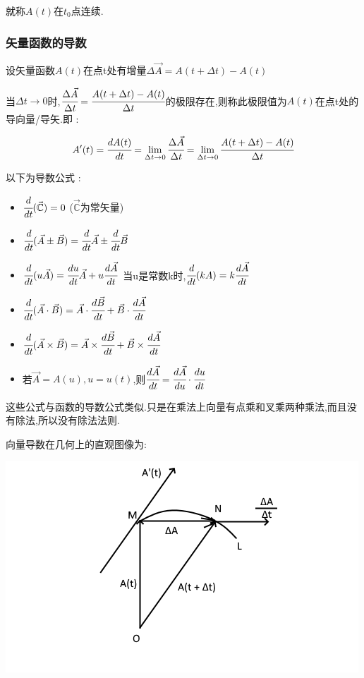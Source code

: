 \documentclass[UTF8,12pt]{ctexbook}
\newcommand{\limNormal}[1]{\lim\limits_{#1}}
\newcommand{\derivative}{^\prime}
\newcommand{\mathConstant}{\mathbb{C}}
\begin{document}
{{{{{      就称$A(t)$在$t_0$点连续.
    }%

    \subsubsection{矢量函数的导数}{
      设矢量函数$A(t)$在点t处有增量$\Delta \vec{A} = A(t + \Delta t) - A(t)$

      当$\Delta t \to 0$时,$\cfrac{\Delta \vec{A}}{\Delta t} = \cfrac{A(t + \Delta t) - A(t)}{\Delta t}$的极限存在,则称此极限值为$A(t)$在点t处的导向量/导矢.即 :

      $$
        A\derivative(t) = \cfrac{dA(t)}{dt} = \limNormal{\Delta t \to 0}\cfrac{\Delta \vec{A}}{\Delta t} = \limNormal{\Delta t \to 0}\cfrac{A(t + \Delta t) - A(t)}{\Delta t}
      $$

      以下为导数公式 :

      \begin{itemize}
        \item $\cfrac{d}{dt}(\vec{\mathConstant}) = 0$ ($\vec{\mathConstant}$为常矢量)
        \item $\cfrac{d}{dt}(\vec{A} \pm \vec{B}) = \cfrac{d}{dt}\vec{A} \pm \cfrac{d}{dt}\vec{B}$
        \item $\cfrac{d}{dt}(u\vec{A}) = \cfrac{du}{dt}\vec{A} + u\cfrac{d\vec{A}}{dt}$\ 当u是常数k时,$\cfrac{d}{dt}(kA) = k\cfrac{d\vec{A}}{dt}$
        \item $\cfrac{d}{dt}(\vec{A}\cdot\vec{B}) = \vec{A}\cdot\cfrac{d\vec{B}}{dt} + \vec{B}\cdot\cfrac{d\vec{A}}{dt}$
        \item $\cfrac{d}{dt}(\vec{A}\times\vec{B}) = \vec{A}\times\cfrac{d\vec{B}}{dt} + \vec{B}\times\cfrac{d\vec{A}}{dt}$
        \item 若$\vec{A} = A(u),u = u(t)$,则$\cfrac{d\vec{A}}{dt} = \cfrac{d\vec{A}}{du}\cdot\cfrac{du}{dt}$
      \end{itemize}

      这些公式与函数的导数公式类似.只是在乘法上向量有点乘和叉乘两种乘法,而且没有除法,所以没有除法法则.

      向量导数在几何上的直观图像为:

      \includegraphics{resources/derivativeOfVectorFunction.png}

}}}}}
\end{document}
